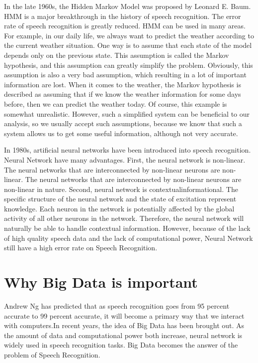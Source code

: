 \documentclass[sigconf]{acmart}
\begin{document}
In the late 1960s, the Hidden Markov Model was proposed by Leonard E. Baum. HMM is a major breakthrough in the history of speech recognition. The error rate of speech recognition is greatly reduced. \cite{hmm} HMM can be used in many areas. For example, in our daily life, we always want to predict the weather according to the current weather situation. One way is to assume that each state of the model depends only on the previous state. This assumption is called the Markov hypothesis, and this assumption can greatly simplify the problem. Obviously, this assumption is also a very bad assumption, which resulting in a lot of important information are lost. When it comes to the weather, the Markov hypothesis is described as assuming that if we know the weather information for some days before, then we can predict the weather today. Of course, this example is somewhat unrealistic. However, such a simplified system can be beneficial to our analysis, so we usually accept such assumptions, because we know that such a system allows us to get some useful information, although not very accurate.

In 1980s, artificial neural networks have been introduced into speech recognition.\cite{ann} Neural Network have many advantages. First, the neural network is non-linear. The neural networks that are interconnected by non-linear neurons are non-linear. The neural networks that are interconnected by non-linear neurons are non-linear in nature. Second, neural network is contextualinformational. The specific structure of the neural network and the state of excitation represent knowledge. Each neuron in the network is potentially affected by the global activity of all other neurons in the network. Therefore, the neural network will naturally be able to handle contextual information. However, because of the lack of high quality speech data and the lack of computational power,  Neural Network still have a high error rate on Speech Recognition.

\section{Why Big Data is important}
Andrew Ng has predicted that as speech recognition goes from 95 percent accurate to 99 percent accurate, it will become a primary way that we interact with computers.\cite{medium}In recent years, the idea of Big Data has been brought out. As the amount of data and computational power both increase, neural network is widely used in speech recognition tasks. Big Data becomes the answer of the problem of Speech Recognition.
\end{document}
